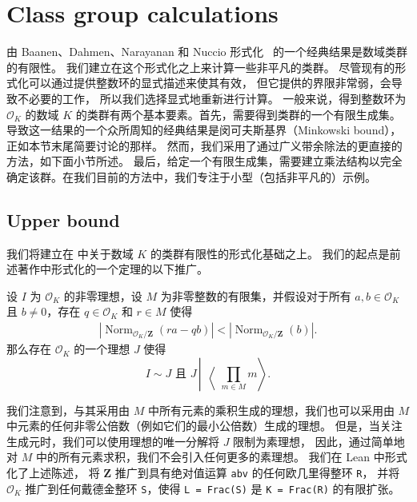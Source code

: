 \documentclass[sigplan,10pt,nonacm,
screen]{acmart} \settopmatter{printfolios=true,printccs=false,printacmref=false}
\newcommand{\ZZ}{\mathbf{Z}}
\newcommand{\OK}{\mathcal{O}_K}
\DeclareMathOperator{\Norm}{Norm}
\begin{document}
\section{Class group calculations}\label{sec:class_group}

由 Baanen、Dahmen、Narayanan 和 Nuccio 形式化~\cite{baanen_formalization_2021} 的一个经典结果是数域类群的有限性。
我们建立在这个形式化之上来计算一些非平凡的类群。
尽管现有的形式化可以通过提供整数环的显式描述来使其有效，
但它提供的界限非常弱，会导致不必要的工作，
所以我们选择显式地重新进行计算。
一般来说，得到整数环为 $\mathcal{O}_K$ 的数域 $K$ 的类群有两个基本要素。首先，需要得到类群的一个有限生成集。导致这一结果的一个众所周知的经典结果是闵可夫斯基界（Minkowski bound），正如本节末尾简要讨论的那样。
然而，我们采用了通过广义带余除法的更直接的方法，如下面小节所述。
最后，给定一个有限生成集，需要建立乘法结构以完全确定该群。在我们目前的方法中，我们专注于小型（包括非平凡的）示例。

\subsection{Upper bound} \label{sec:upper bound}

我们将建立在 \cite[Section 8.2]{baanen_formalization_2021} 中关于数域 $K$ 的类群有限性的形式化基础之上。
我们的起点是前述著作中形式化的一个定理的以下推广。

\begin{theorem}\label{thm main class group divisibility}
设 $I$ 为 $\OK$ 的非零理想，设 $M$ 为非零整数的有限集，并假设对于所有 $a,b \in \mathcal{O}_K$ 且 $b\not= 0$，存在 $q \in \OK$ 和 $r \in M$ 使得
\begin{align}
  |\Norm_{\OK/\ZZ}(ra-qb)| < |\Norm_{\OK/\ZZ}(b)|. \label{eqn:div-with-remainder}
\end{align}
那么存在 $\OK$ 的一个理想 $J$ 使得
\[I \sim J \text{ 且 } J \,\left|\, \middle\langle \prod_{m \in M} m \right\rangle.\]
\end{theorem}

我们注意到，与其采用由 $M$ 中所有元素的乘积生成的理想，我们也可以采用由 $M$ 中元素的任何非零公倍数（例如它们的最小公倍数）生成的理想。
但是，当关注生成元时，我们可以使用理想的唯一分解将 $J$ 限制为素理想，
因此，通过简单地对 $M$ 中的所有元素求积，我们不会引入任何更多的素理想。
我们在 Lean 中形式化了上述陈述，
将 $\ZZ$ 推广到具有绝对值运算 \lstinline{abv} 的任何欧几里得整环 \lstinline{R}，
并将 $\OK$ 推广到任何戴德金整环 \lstinline{S}，使得 \lstinline{L = Frac(S)} 是 \lstinline{K = Frac(R)} 的有限扩张。
\end{document}

